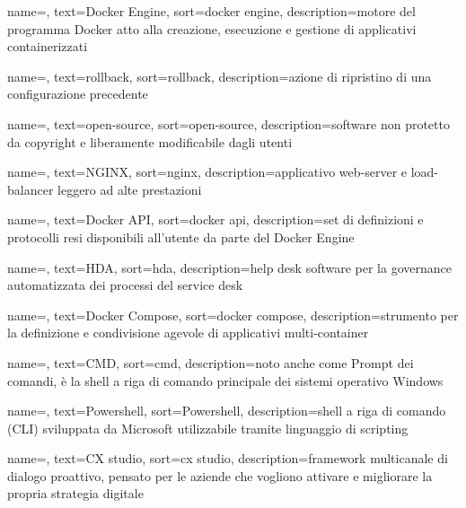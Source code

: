 {
    name=,
    text=Docker Engine,
    sort=docker engine, 
    description={motore del programma Docker atto alla creazione, esecuzione e gestione di applicativi containerizzati}
}

{
    name=,
    text=rollback,
    sort=rollback, 
    description={azione di ripristino di una configurazione precedente}
}

{
    name=,
    text=open-source,
    sort=open-source, 
    description={software non protetto da copyright e liberamente modificabile dagli utenti}
}

{
    name=,
    text=NGINX,
    sort=nginx, 
    description={applicativo web-server e load-balancer leggero ad alte prestazioni}
}

{
    name=,
    text=Docker API,
    sort=docker api, 
    description={set di definizioni e protocolli resi disponibili all'utente da parte del Docker Engine}
}

{
    name=,
    text=HDA,
    sort=hda, 
    description={help desk software per la governance automatizzata dei processi del service desk}
}

{
    name=,
    text=Docker Compose,
    sort=docker compose, 
    description={strumento per la definizione e condivisione agevole di applicativi multi-container}
}

{
    name=,
    text=CMD,
    sort=cmd, 
    description={noto anche come Prompt dei comandi, è la shell a riga di comando principale dei sistemi operativo Windows}
}

{
    name=,
    text=Powershell,
    sort=Powershell, 
    description={shell a riga di comando (CLI) sviluppata da Microsoft utilizzabile tramite linguaggio di scripting}
}

{
    name=,
    text=CX studio,
    sort=cx studio, 
    description={framework multicanale di dialogo proattivo, pensato per le aziende che vogliono attivare e migliorare la propria strategia digitale}
}

